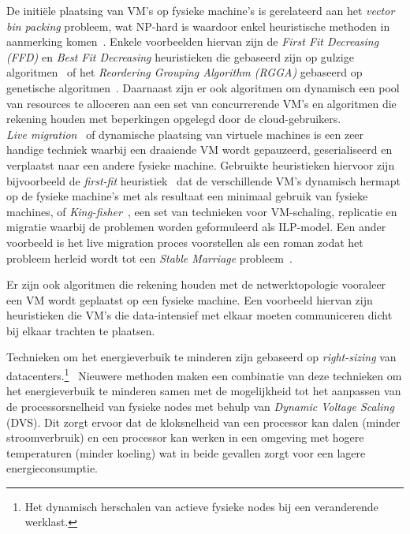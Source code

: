 De initiële plaatsing van VM's op fysieke machine's is gerelateerd aan het \textit{vector bin packing} probleem, wat NP-hard is waardoor enkel heuristische methoden in aanmerking komen~\cite{Hochba1997}. Enkele voorbeelden hiervan zijn de \textit{First Fit Decreasing (FFD)} en \textit{Best Fit Decreasing} heuristieken die gebaseerd zijn op gulzige algoritmen~\cite{Panigrahy2011} of het \textit{Reordering Grouping Algorithm (RGGA)} gebaseerd op genetische algoritmen~\cite{Wilcox2011}. Daarnaast zijn er ook algoritmen om dynamisch een pool van resources te alloceren aan een set van concurrerende VM's en algoritmen die rekening houden met beperkingen opgelegd door de cloud-gebruikers.\\
\textit{Live migration}~\cite{Clark2005} of dynamische plaatsing van virtuele machines is een zeer handige techniek waarbij een draaiende VM wordt gepauzeerd, geserialiseerd en verplaatst naar een andere fysieke machine. Gebruikte heuristieken hiervoor zijn bijvoorbeeld de \textit{first-fit} heuristiek~\cite{Bobroff2007} dat de verschillende VM's dynamisch hermapt op de fysieke machine's met als resultaat een minimaal gebruik van fysieke machines, of \textit{King-fisher}~\cite{Sharma2011}, een set van technieken voor VM-schaling, replicatie en migratie waarbij de problemen worden geformuleerd als ILP-model. Een ander voorbeeld is het live migration proces voorstellen als een roman zodat het probleem herleid wordt tot een \textit{Stable Marriage} probleem~\cite{Xu2011}.

Er zijn ook algoritmen die rekening houden met de netwerktopologie vooraleer een VM wordt geplaatst op een fysieke machine. Een voorbeeld hiervan zijn heuristieken die VM's die data-intensief met elkaar moeten communiceren dicht bij elkaar trachten te plaatsen.

Technieken om het energieverbuik te minderen zijn gebaseerd op \textit{right-sizing} van datacenters.\footnote{Het dynamisch herschalen van actieve fysieke nodes bij een veranderende werklast.}~\cite{Chase2001} Nieuwere methoden maken een combinatie van deze technieken om het energieverbuik te minderen samen met de mogelijkheid tot het aanpassen van de processorsnelheid van fysieke nodes met behulp van \textit{Dynamic Voltage Scaling} (DVS). Dit zorgt ervoor dat de kloksnelheid van een processor kan dalen (minder stroomverbruik) en een processor kan werken in een omgeving met hogere temperaturen (minder koeling) wat in beide gevallen zorgt voor een lagere energieconsumptie.

